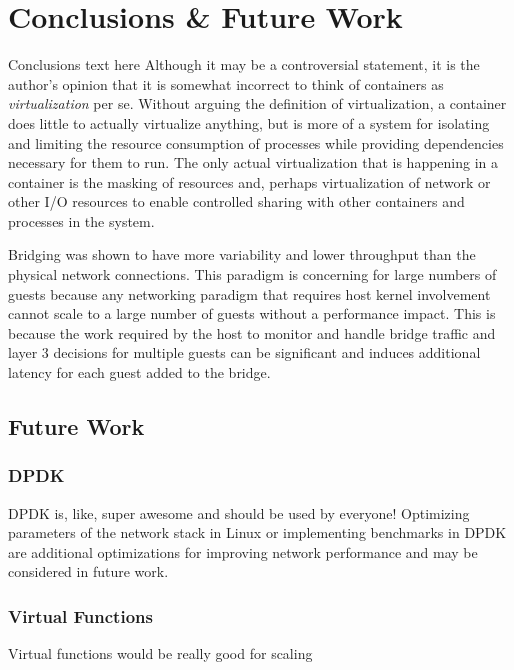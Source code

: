 \chapter{Conclusions \& Future Work}
\label{cha:conclusions}
\label{sec:conclusions}
Conclusions text here
Although it may be a controversial statement, it is the author's opinion that it is somewhat incorrect to think of containers as \emph{virtualization} per se.  
Without arguing the definition of virtualization, a container does little to actually virtualize anything, but is more of a system for isolating and limiting the resource consumption of processes while providing dependencies necessary for them to run.  
The only actual virtualization that is happening in a container is the masking of resources and, perhaps virtualization of network or other I/O resources to enable controlled sharing with other containers and processes in the system. 

Bridging was shown to have more variability and lower throughput than the physical network connections.  
This paradigm is concerning for large numbers of guests because any networking paradigm that requires host kernel involvement cannot scale to a large number of guests without a performance impact.
This is because the work required by the host to monitor and handle bridge traffic and layer 3 decisions for multiple guests can be significant and induces additional latency for each guest added to the bridge.    

\section{Future Work}
\label{sec:future_work}
\subsection{DPDK}
DPDK is, like, super awesome and should be used by everyone!
Optimizing parameters of the network stack in Linux or implementing benchmarks in DPDK are additional optimizations for improving network performance and may be considered in future work.

\subsection{Virtual Functions}
\label{sec:virtual_functions}
Virtual functions would be really good for scaling

